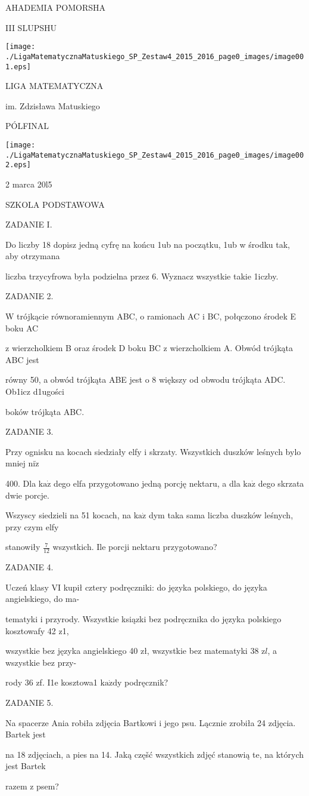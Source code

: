 \documentclass[a4paper,12pt]{article}
\begin{document}
AHADEMIA POMORSHA

III SLUPSHU
\begin{center}
\texttt{[image: ./LigaMatematycznaMatuskiego\_SP\_Zestaw4\_2015\_2016\_page0\_images/image001.eps]}
\end{center}
LIGA MATEMATYCZNA

im. Zdzisława Matuskiego

PÓLFINAL
\begin{center}
\texttt{[image: ./LigaMatematycznaMatuskiego\_SP\_Zestaw4\_2015\_2016\_page0\_images/image002.eps]}
\end{center}
2 marca 20l5

SZKOLA PODSTAWOWA

ZADANIE I.

Do liczby 18 dopisz jedną cyfrę na końcu 1ub na początku, 1ub w środku tak, aby otrzymana

liczba trzycyfrowa była podzielna przez 6. Wyznacz wszystkie takie 1iczby.

ZADANIE 2.

W trójkącie równoramiennym ABC, o ramionach AC i BC, połqczono środek E boku AC

z wierzcholkiem B oraz środek D boku BC z wierzcholkiem A. Obwód trójkąta ABC jest

równy 50, a obwód trójkąta ABE jest o 8 większy od obwodu trójkąta ADC. Ob1icz d1ugości

boków trójkąta ABC.

ZADANIE 3.

Przy ognisku na kocach siedziały elfy i skrzaty. Wszystkich duszków leśnych bylo mniej $\mathrm{n}\mathrm{i}\dot{\mathrm{z}}$

400. Dla $\mathrm{k}\mathrm{a}\dot{\mathrm{z}}$ dego elfa przygotowano jedną porcję nektaru, a dla $\mathrm{k}\mathrm{a}\dot{\mathrm{z}}$ dego skrzata dwie porcje.

Wszyscy siedzieli na 51 kocach, na $\mathrm{k}\mathrm{a}\dot{\mathrm{z}}$ dym taka sama liczba duszków leśnych, przy czym elfy

stanowiły $\displaystyle \frac{7}{12}$ wszystkich. Ile porcji nektaru przygotowano?

ZADANIE 4.

Uczeń klasy VI kupił cztery podręczniki: do języka polskiego, do języka angielskiego, do ma-

tematyki i przyrody. Wszystkie ksiązki bez podręcznika do języka polskiego kosztowafy 42 z1,

wszystkie bez języka angielskiego 40 zł, wszystkie bez matematyki 38 $\mathrm{z}l$, a wszystkie bez przy-

rody 36 zf. I1e kosztowa1 $\mathrm{k}\mathrm{a}\dot{\mathrm{z}}\mathrm{d}\mathrm{y}$ podręcznik?

ZADANIE 5.

Na spacerze Ania robiła zdjęcia Bartkowi i jego psu. Lącznie zrobiła 24 zdjęcia. Bartek jest

na 18 zdjęciach, a pies na 14. Jaką częšć wszystkich zdjęć stanowią te, na których jest Bartek

razem z psem?
\end{document}
